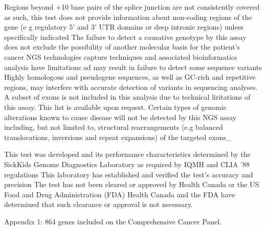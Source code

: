 \documentclass[8pt,letterpaper]{extarticle}
\begin{document}
{Regions beyond +10 base pairs of the splice junction are not consistently covered as such, this test does not provide information about non-coding regions of the gene (e g regulatory 5' and 3' UTR domains or deep intronic regions) unless specifically indicated The failure to detect a causative genotype by this assay does not exclude the possibility of another molecular basis for the patient's cancer NGS technologies capture techniques and associated bioinformatics analysis have limitations ad may result in failure to detect some sequence variants  Highly homologous and pseudogene sequences, as well as GC-rich and repetitive regions, may interfere with accurate detection of variants in sequencing analyses. A subset of exons is not included in this analysis due to technical liritations of this assay. This list is available upon request.   Certain types of genomic alterations known to cause disease will not be detected by this NGS assay including, but not limited to, structural rearrangements (e.g balanced translocations, inversions and repeat expansions) of the targeted exons\_

This test was developed and its performance characteristics determined by the SickKids Genome Diagnostics Laboratory as required by IQMH and CLIA '88 regulations This laboratory has established and verified the test's accuracy and precision The test has not been cleared or approved by Health Canada or the US Food and Drug Administration (FDA) Health Canada and the FDA have determined that such clearance or approval is not necessary.
}

Appendix 1: 864 genes included on the Comprehensive Cancer Panel. 
\end{document}
